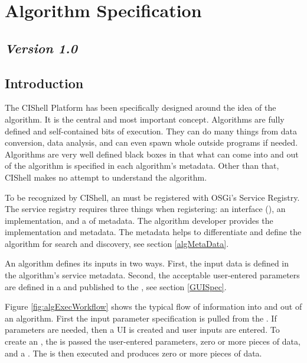 \section{Algorithm Specification}

\subsection*{\textit{Version 1.0}}

\subsection{Introduction}

The CIShell Platform has been specifically designed around the idea of the
algorithm. It is the central and most important concept. Algorithms are fully
defined and self-contained bits of execution. They can do many things from data
conversion, data analysis, and can even spawn whole outside programs if needed.
Algorithms are very well defined black boxes in that what can come into and out
of the algorithm is specified in each algorithm's metadata. Other than that,
CIShell makes no attempt to understand the algorithm.

To be recognized by CIShell, an  must be registered with
OSGi's Service Registry. The service registry requires three things when
registering: an interface (), an implementation, and a
 of metadata. The algorithm developer provides the
implementation and metadata. The metadata helps to differentiate and define the
algorithm for search and discovery, see section \ref{algMetaData}.

An algorithm defines its inputs in two ways. First, the input data is defined in
the algorithm's service metadata. Second, the acceptable user-entered parameters
are defined in a  and published to the
, see section \ref{GUISpec}.

Figure \ref{fig:algExecWorkflow} shows the typical flow of information into and
out of an algorithm. First the input parameter specification is pulled from the
. If parameters are needed, then a UI is created and
user inputs are entered. To create an , the
 is passed the user-entered parameters, zero or more
pieces of data, and a . The  is then
executed and produces zero or more pieces of data.

